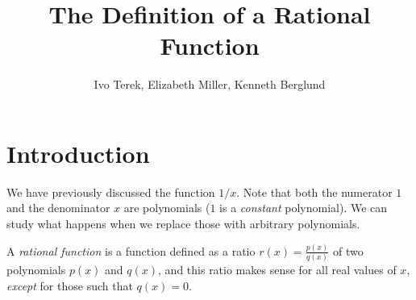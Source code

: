 \documentclass{ximera}
\author{Ivo Terek, Elizabeth Miller, Kenneth Berglund}
\title{The Definition of a Rational Function}
\begin{document}
\licenseSZ
\begin{abstract}
\end{abstract}
\maketitle


%



\section{Introduction}

We have previously discussed the function $1/x$. Note that both the numerator $1$ and the denominator $x$ are polynomials ($1$ is a \emph{constant} polynomial). We can study what happens when we replace those with arbitrary polynomials.

\begin{definition}
  A \emph{rational function} is a function defined as a ratio $r(x) = \frac{p(x)}{q(x)}$ of two polynomials $p(x)$ and $q(x)$, and this ratio makes sense for all real values of $x$, \emph{except} for those such that $q(x) = 0$.
\end{definition}
\end{document}
